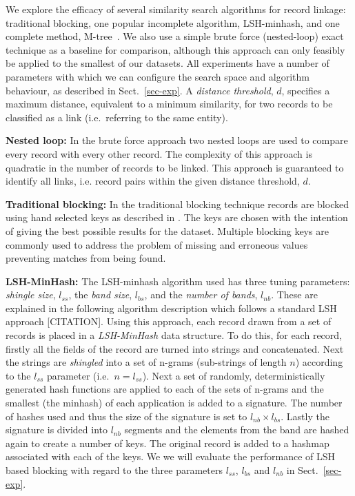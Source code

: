 \documentclass{llncs}
\begin{document}
We explore the efficacy of several similarity search algorithms for
record linkage: traditional blocking, one popular incomplete algorithm, LSH-minhash, and one complete
method, M-tree~\cite{paolociaccia2m}. We also use a simple brute force
(nested-loop) exact technique as a baseline for comparison, although
this approach can only feasibly be applied to the smallest of our
datasets. All experiments have a number of parameters with which we can
configure the search space and algorithm behaviour, as described in
Sect.~\ref{sec-exp}. A \emph{distance threshold}, $d$, specifies a
maximum distance, equivalent to a minimum similarity, for two records to
be classified as a link (i.e.\ referring to the same entity).

\smallskip
\textbf{Nested loop:}
In the brute force approach two nested loops are used to compare every 
record with every other record. The complexity of this 
approach is quadratic in the number of records to
be linked. This approach is guaranteed to identify all links, i.e. record pairs within the given distance threshold, $d$.

\smallskip
\textbf{Traditional  blocking:}
In the traditional blocking technique records are blocked using hand selected keys as described in \cite{Chr12b}. The keys are chosen with the intention of giving the best possible results for the dataset. Multiple blocking keys are commonly used to address the problem of missing and erroneous values preventing matches from being found.

\smallskip
\textbf{LSH-MinHash:}
The LSH-minhash algorithm used has three tuning parameters:
\emph{shingle size}, $l_{ss}$, the \emph{band size}, $l_{bs}$, and the
\emph{number of bands}, $l_{nb}$.
These are explained in the following algorithm description which follows a standard LSH approach [CITATION].
Using this approach, each record drawn from a set of records is placed in a \emph{LSH-MinHash} data structure.
To do this, for each record, firstly all the fields of the record are turned into strings and 
concatenated. Next the strings are \emph{shingled} into a set of
n-grams (sub-strings of length $n$) according to the $l_{ss}$
parameter (i.e.\ $n = l_{ss}$). Next a set of randomly, 
deterministically generated hash functions are applied to each of the
sets of n-grams and the smallest (the minhash) of each application is
added to a signature. The number of hashes used and thus the size of
the signature is set to $l_{nb} \times l_{bs}$.
Lastly the signature is divided into $l_{nb}$ segments and the elements from the band are hashed again to create a number of keys.
The original record is added to a hashmap associated with each of the keys. 
We we will evaluate the performance of LSH based blocking with regard to the three parameters $l_{ss}$, $l_{bs}$ and $l_{nb}$ in
Sect.~\ref{sec-exp}.
\end{document}
